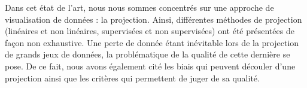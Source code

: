 Dans cet état de l'art, nous nous sommes concentrés sur une approche de visualisation de données : la projection. 
Ainsi, différentes méthodes de projection (linéaires et non linéaires, supervisées et non supervisées) ont été présentées de façon non exhaustive. 
Une perte de donnée étant inévitable lors de la projection de grands jeux de données, la problématique de la qualité de cette dernière se pose. 
De ce fait, nous avons également cité les biais qui peuvent découler d'une projection ainsi que les critères qui permettent de juger de sa qualité.
